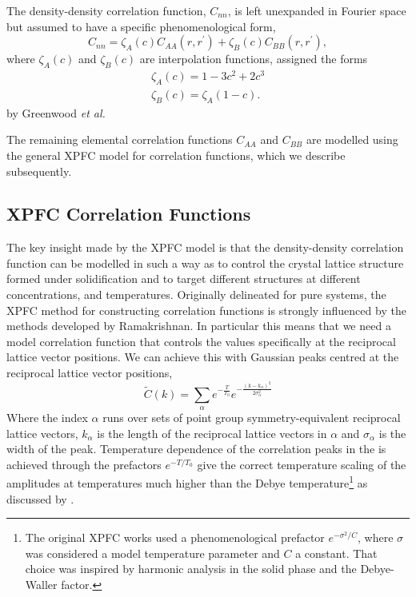\documentclass[showkeys, prb, reprint]{revtex4-1}
\newcommand{\f}{\frac}          %
\begin{document}
The density-density correlation function, $C_{nn}$, is left unexpanded in 
Fourier space but assumed to have a specific phenomenological form,
%
\begin{equation}
    \label{eq:xpfc_corr}
    C_{nn} = \zeta_A(c) C_{AA}(r, r^\prime) 
           + \zeta_B(c) C_{BB}(r, r^\prime),
\end{equation}
%
where $\zeta_A(c)$ and $\zeta_B(c)$ are interpolation functions, assigned the forms
%
\begin{gather}
    \zeta_A(c) = 1 - 3c^2 + 2c^3 \\
    \zeta_B(c) = \zeta_A(1 - c).
\end{gather}
%
by Greenwood \textit{et al.}

The remaining elemental correlation functions $C_{AA}$ and $C_{BB}$ are modelled
using the general XPFC model for correlation functions, which we describe
subsequently.

\subsection{XPFC Correlation Functions} %

The key insight made by the XPFC model is that the density-density
correlation function can be modelled in such a way as to control the crystal
lattice structure formed under solidification and to target different structures at
different concentrations, and temperatures. Originally delineated for pure
systems, the XPFC method for constructing correlation functions is strongly
influenced by the methods developed by Ramakrishnan. In particular this means
that we need a model correlation function that controls the values specifically
at the reciprocal lattice vector positions. We can achieve this with Gaussian
peaks centred at the reciprocal lattice vector positions,
%
\begin{equation}
    \tilde{C}(k) = \sum_{\alpha} e^{-\f{T}{T_0}}
        e^{ - \f{(k - k_\alpha)^2}{2\sigma_\alpha^2}}
        \label{XPFC_C2}
\end{equation}
%
Where the index $\alpha$ runs over sets of point group symmetry-equivalent
reciprocal lattice vectors, $k_\alpha$ is the length of the reciprocal lattice
vectors in $\alpha$ and $\sigma_\alpha$ is the width of the peak. Temperature
dependence of the correlation peaks in the is achieved through the prefactors
$e^{-T / T_0}$ give the correct temperature scaling of the amplitudes at
temperatures much higher than the Debye temperature\footnote{The original XPFC
works used a phenomenological prefactor $e^{-\sigma^2 / C}$, where $\sigma$
was considered a model temperature parameter and $C$ a constant. That choice
was inspired by harmonic analysis in the solid phase and the Debye-Waller
factor.} as discussed by \cite{ALSTER17}.
\end{document}
